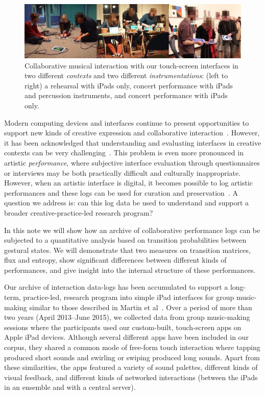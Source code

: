 \documentclass{sigchi}
\begin{document}
\begin{figure}
  \centering
  \includegraphics[width=\linewidth]{figures/three-performance-contexts}
  \caption{Collaborative musical interaction with our touch-screen
    interfaces in two different {\em contexts} and two different {\em
      instrumentations}: (left to right) a rehearsal with iPads only,
    concert performance with iPads and percussion instruments, and
    concert performance with iPads
    only.\label{fig:three-performance-contexts}}
\end{figure}


Modern computing devices and interfaces continue to present
opportunities to support new kinds of creative expression and
collaborative interaction~\cite{Resnick:2005yu}. However, it has been
acknowledged that understanding and evaluating interfaces in creative
contexts can be very challenging~\cite{Shneiderman:2007qv}. This problem is
even more pronounced in artistic \emph{performance}, where subjective
interface evaluation through questionnaires or interviews may be both
practically difficult and culturally inappropriate. However, when an artistic interface
is digital, it becomes possible to log artistic performances and these
logs can be used for curation and
preservation~\cite{England:2014ys}. A question we address is: can this log data
be used to understand and support a
broader creative-practice-led research program?

In this note we will show how an archive of collaborative performance
logs can be subjected to a quantitative analysis based on
transition probabilities between gestural states. We will demonstrate
that two measures on transition matrices, flux and entropy, show
significant differences between different kinds of performances, and
give insight into the internal structure of these performances.

Our archive of interaction data-logs has been accumulated to support a
long-term, practice-led, research program into simple iPad interfaces
for group music-making similar to those described in Martin et
al~\cite{Martin:2014cr}. Over a period of more than two years (April
2013--June 2015), we collected data from group music-making sessions
where the participants used our custom-built, touch-screen apps on
Apple iPad devices. Although several different apps have been included
in our corpus, they shared a common mode of free-form touch
interaction where tapping produced short sounds and swirling or
swiping produced long sounds. Apart from these similarities, the apps
featured a variety of sound palettes, different kinds of visual
feedback, and different kinds of networked interactions (between the
iPads in an ensemble and with a central server).
\end{document}

